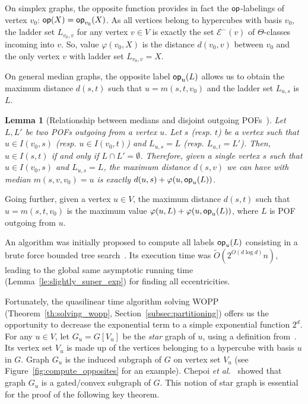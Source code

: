 \documentclass{article}
\newtheorem{lemma}{Lemma}
\newcommand{\opp}{\mbox{\textsf{op}}}
\begin{document}
On simplex graphs, the opposite function provides in fact the $\opp$-labelings of vertex $v_0$: $\opp(X) = \opp_{v_0}(X)$. As all vertices belong to hypercubes with basis $v_0$, the ladder set $L_{v_0,v}$ for any vertex $v\in V$ is exactly the set $\mathcal{E}^-(v)$ of $\Theta$-classes incoming into $v$. So, value $\varphi(v_0,X)$ is the distance $d(v_0,v)$ between $v_0$ and the only vertex $v$ with ladder set $L_{v_0,v} = X$.

On general median graphs, the opposite label $\opp_u(L)$ allows us to obtain the maximum distance $d(s,t)$ such that $u = m(s,t,v_0)$ and the ladder set $L_{u,s}$ is $L$.

\begin{lemma}[Relationship between medians and disjoint outgoing POFs~\cite{BeHa21}]
Let $L,L'$ be two POFs outgoing from a vertex $u$. Let $s$ (resp. $t$) be a vertex such that $u \in I(v_0,s)$ (resp. $u \in I(v_0,t)$) and $L_{u,s} = L$ (resp. $L_{u,t} = L'$). Then, $u \in I(s,t)$ if and only if $L \cap L' = \emptyset$. Therefore, given a single vertex $s$ such that $u \in I(v_0,s)$ and $L_{u,s} = L$, the maximum distance $d(s,v)$ we can have with median $m(s,v,v_0) = u$ is exactly $d(u,s)+\varphi(u,\opp_u(L))$.
\label{le:property_opp}
\end{lemma}

Going further, given a vertex $u \in V$, the maximum distance $d(s,t)$ such that $u = m(s,t,v_0)$ is the maximum value $\varphi(u,L) + \varphi(u,\opp_u(L))$, where $L$ is POF outgoing from $u$.

An algorithm was initially proposed to compute all labels $\opp_u(L)$ consisting in a brute force bounded tree search~\cite{BeHa21}. Its execution time was $\tilde{O}(2^{O(d\log d)}n)$, leading to the global same asymptotic running time (Lemma~\ref{le:slightly_super_exp}) for finding all eccentricities.

Fortunately, the quasilinear time algorithm solving WOPP (Theorem~\ref{th:solving_wopp}, Section~\ref{subsec:partitioning}) offers us the opportunity to decrease the exponential term to a simple exponential function $2^d$. For any $u \in V$, let $G_u =  G\left[V_u\right]$ be the \textit{star} graph of $u$, using a definition from~\cite{ChLaRa19}. Its vertex set $V_u$ is made up of the vertices belonging to a hypercube with basis $u$ in $G$. Graph $G_u$ is the induced subgraph of $G$ on vertex set $V_u$ (see Figure~\ref{fig:compute_opposites} for an example). Chepoi {\em et al.}~\cite{ChLaRa19} showed that graph $G_u$ is a gated/convex subgraph of $G$. This notion of star graph is essential for the proof of the following key theorem.
\end{document}
